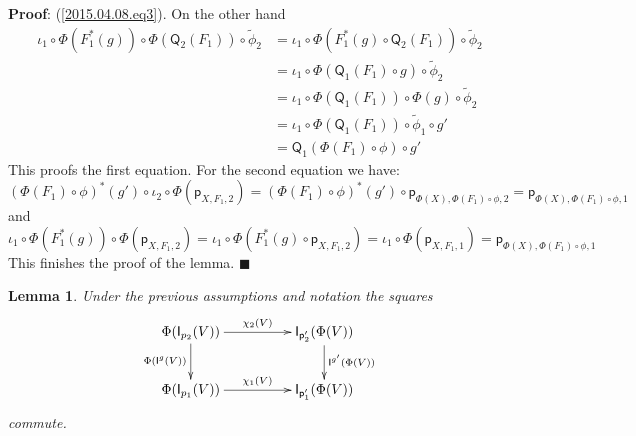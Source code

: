 \documentclass[12pt]{article}
\numberwithin{equation}{section}
\newenvironment{myproof}{{\bf Proof}:}{$\blacksquare$ \vskip 5mm }
\newtheorem{lemma}[proposition]{Lemma}
\newcommand{\wt}{\widetilde}
\newcommand{\p}{\mathsf{p}}
\newcommand{\I}{\mathsf{I}}
\newcommand{\Q}{\mathsf{Q}}
\begin{document}
\begin{myproof}
(\ref{2015.04.08.eq3}). On the other hand
%
\begin{align*}
  \iota_1\circ \Phi(F_1^*(g))\circ \Phi(\Q_2(F_1))\circ\wt{\phi}_2
    & = \iota_1\circ \Phi(F_1^*(g)\circ \Q_2(F_1))\circ \wt{\phi}_2 \\
    & = \iota_1\circ \Phi(\Q_1(F_1)\circ g)\circ \wt{\phi}_2 \\
    & = \iota_1\circ \Phi(\Q_1(F_1))\circ \Phi(g)\circ \wt{\phi}_2 \\
    & = \iota_1\circ \Phi(\Q_1(F_1))\circ \wt{\phi}_1\circ g' \\
    & = \Q_1(\Phi(F_1)\circ \phi)\circ g'
\end{align*}
%
This proofs the first equation. For the second equation we have:
%
$$(\Phi(F_1)\circ \phi)^*(g')\circ \iota_2\circ
\Phi(\p_{X,F_1,2})=(\Phi(F_1)\circ \phi)^*(g')\circ
\p_{\Phi(X),\Phi(F_1)\circ\phi,2}=\p_{\Phi(X),\Phi(F_1)\circ\phi,1}$$
%
and
%
$$\iota_1\circ \Phi(F_1^*(g))\circ \Phi(\p_{X,F_1,2})=\iota_1\circ
\Phi(F_1^*(g)\circ \p_{X,F_1,2})=\iota_1\circ
\Phi(\p_{X,F_1,1})=\p_{\Phi(X),\Phi(F_1)\circ \phi,1}$$
%
This finishes the proof of the lemma.
\end{myproof}
%
\begin{lemma}
\label{2015.04.06.l7} Under the previous assumptions and notation the squares
%
$$
\begin{xy}
          \xymatrix@C=4pc{ \Phi(\I_{p_2}(V)) \ar[r]^-{\chi_2(V)}
            \ar[d]_{\Phi(\I^g(V))} & \I_{\p_2'}(\Phi(V))
            \ar[d]^{\I^{g'}(\Phi(V))}\\ \Phi(\I_{p_1}(V)) \ar[r]^{\chi_1(V)} &
            \I_{\p_1'}(\Phi(V)) }
\end{xy}
$$
%
commute.
\end{lemma}
%
\end{document}
